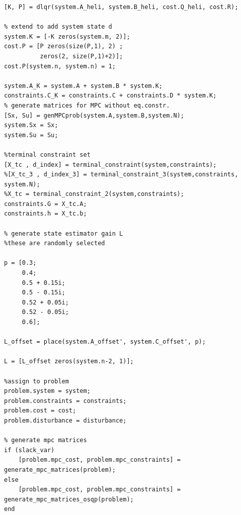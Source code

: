 \begin{lstlisting}[caption={offline\_calc.m}, label={lst:offline_calc}]
% state feedback and terminal cost
[K, P] = dlqr(system.A_heli, system.B_heli, cost.Q_heli, cost.R);

% extend to add system state d
system.K = [-K zeros(system.m, 2)];
cost.P = [P zeros(size(P,1), 2) ;
          zeros(2, size(P,1)+2)];
cost.P(system.n, system.n) = 1;      
      
system.A_K = system.A + system.B * system.K; 
constraints.C_K = constraints.C + constraints.D * system.K;
% generate matrices for MPC without eq.constr.
[Sx, Su] = genMPCprob(system.A,system.B,system.N);
system.Sx = Sx;
system.Su = Su;

%terminal constraint set 
[X_tc , d_index] = terminal_constraint(system,constraints);
%[X_tc_3 , d_index_3] = terminal_constraint_3(system,constraints, system.N);
%X_tc = terminal_constraint_2(system,constraints);
constraints.G = X_tc.A;
constraints.h = X_tc.b;
   
% generate state estimator gain L
%these are randomly selected

p = [0.3; 
     0.4; 
     0.5 + 0.15i; 
     0.5 - 0.15i; 
     0.52 + 0.05i; 
     0.52 - 0.05i; 
     0.6];

L_offset = place(system.A_offset', system.C_offset', p);

L = [L_offset zeros(system.n-2, 1)];

%assign to problem
problem.system = system;
problem.constraints = constraints;
problem.cost = cost;
problem.disturbance = disturbance;

% generate mpc matrices
if (slack_var)
    [problem.mpc_cost, problem.mpc_constraints] = generate_mpc_matrices(problem);
else    
    [problem.mpc_cost, problem.mpc_constraints] = generate_mpc_matrices_osqp(problem);
end   
\end{lstlisting}

